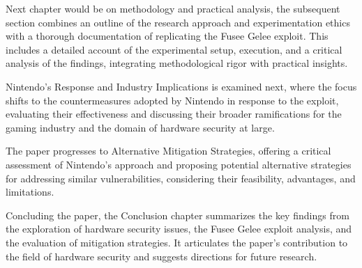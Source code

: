 Next chapter would be on methodology and practical analysis, the
subsequent section combines an outline of the research approach and
experimentation ethics with a thorough documentation of replicating the
Fusee Gelee exploit. This includes a detailed account of the
experimental setup, execution, and a critical analysis of the findings,
integrating methodological rigor with practical insights.

Nintendo's Response and Industry Implications is examined next, where
the focus shifts to the countermeasures adopted by Nintendo in response
to the exploit, evaluating their effectiveness and discussing their
broader ramifications for the gaming industry and the domain of hardware
security at large.

The paper progresses to Alternative Mitigation Strategies, offering a
critical assessment of Nintendo's approach and proposing potential
alternative strategies for addressing similar vulnerabilities,
considering their feasibility, advantages, and limitations.

Concluding the paper, the Conclusion chapter summarizes the key
findings from the exploration of hardware security issues, the Fusee
Gelee exploit analysis, and the evaluation of mitigation strategies. It
articulates the paper's contribution to the field of hardware security
and suggests directions for future research.
